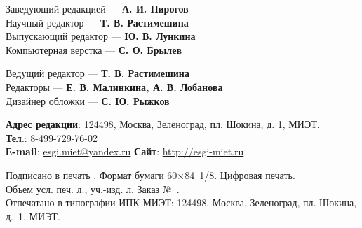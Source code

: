 \noindent
\begin{minipage}[t]{.48\textwidth}
    
    \begin{flushleft}
        \footnotesize
        Заведующий редакцией — \textbf{А. И. Пирогов}\\
        Научный редактор — \textbf{Т. В. Растимешина}\\
        Выпускающий редактор — \textbf{Ю. В. Лункина}\\
        Компьютерная верстка — \textbf{С. О. Брылев}
    \end{flushleft}
\end{minipage}\hspace{0.04\textwidth}
\begin{minipage}[t]{.48\textwidth}
    \begin{flushleft}
        \footnotesize
Ведущий редактор — \textbf{Т. В. Растимешина}\\
Редакторы — \textbf{Е. В. Малинкина, А. В. Лобанова}\\
Дизайнер обложки — \textbf{С. Ю. Рыжков}
    \end{flushleft}
\end{minipage}

\begin{flushleft}
    \footnotesize
    \textbf{Адрес редакции}: 124498, Москва, Зеленоград, пл. Шокина, д. 1, МИЭТ.\\
    \textbf{Тел}.: 8-499-729-76-02\\
    \textbf{Е-mail}: \href{mailto:esgi.miet@yandex.ru}{esgi.miet@yandex.ru} \hspace{3em}
    \textbf{Сайт}: \url{http://esgi-miet.ru}

     \vspace{1em}
    Подписано в печать \esgiPDate. Формат бумаги 60\(×\)84 1/8. Цифровая печать.\\
    Объем \esgiUPL{} усл. печ. л., \esgiUIL{} уч.-изд. л. Заказ № \esgiPRN{}.\\
    Отпечатано в типографии ИПК МИЭТ: 124498, Москва, Зеленоград, пл. Шокина, д. 1, МИЭТ.
\end{flushleft}

\normalsize
\setmainlinespread
\newpage